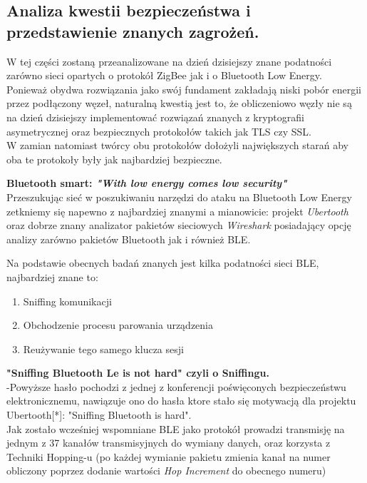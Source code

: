 
\subsection{ Analiza kwestii bezpieczeństwa i przedstawienie znanych zagrożeń. }

\par
\tab W tej części zostaną przeanalizowane na dzień dzisiejszy znane podatności zarówno sieci opartych o protokół ZigBee jak i o Bluetooth Low Energy. Ponieważ obydwa rozwiązania jako swój fundament zakładają niski pobór energii przez podłączony węzeł, naturalną kwestią jest to, że obliczeniowo węzły nie są na dzień dzisiejszy implementować rozwiązań znanych z kryptografii asymetrycznej oraz bezpiecznych protokołów takich jak TLS czy SSL.\\
W zamian natomiast twórcy obu protokołów dołożyli największych starań aby oba te protokoły były jak najbardziej bezpieczne. \\

\par
\tab \textbf{ Bluetooth smart: \textit{"With low energy comes low security"}  }\\

Przeszukując sieć w poszukiwaniu narzędzi do ataku na Bluetooth Low Energy zetkniemy się napewno z najbardziej znanymi a mianowicie: projekt \textit{Ubertooth} oraz dobrze znany analizator pakietów sieciowych \textit{Wireshark} posiadający opcję analizy zarówno pakietów Bluetooth jak i również BLE.

	Na podstawie obecnych badań znanych jest kilka podatności sieci BLE, najbardziej znane to:
\begin{enumerate}
	\item Sniffing komunikacji
	\item Obchodzenie procesu parowania urządzenia
	\item Reużywanie tego samego klucza sesji	
\end{enumerate} 

\par
\tab \textbf{ "Sniffing Bluetooth Le is not hard" czyli o Sniffingu. }\\
-Powyższe hasło pochodzi z jednej z konferencji poświęconych bezpieczeństwu elektronicznemu, nawiązuje ono do hasła ktore stało się motywacją dla projektu Ubertooth[*]: "Sniffing Bluetooth is hard".\\
Jak zostało wcześniej wspomniane BLE jako protokół prowadzi transmisję na jednym z 37 kanałów transmisyjnych do wymiany danych, oraz korzysta z Techniki Hopping-u (po każdej wymianie pakietu zmienia kanał na numer obliczony poprzez dodanie wartości \textit{Hop Increment} do obecnego numeru) \\

